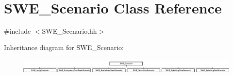 \hypertarget{classSWE__Scenario}{\section{S\-W\-E\-\_\-\-Scenario Class Reference}
\label{classSWE__Scenario}
}


{\ttfamily \#include $<$S\-W\-E\-\_\-\-Scenario.\-hh$>$}

Inheritance diagram for S\-W\-E\-\_\-\-Scenario\-:\begin{figure}[H]
\begin{center}
\leavevmode
\includegraphics[height=0.825959cm]{classSWE__Scenario}
\end{center}
\end{figure}
